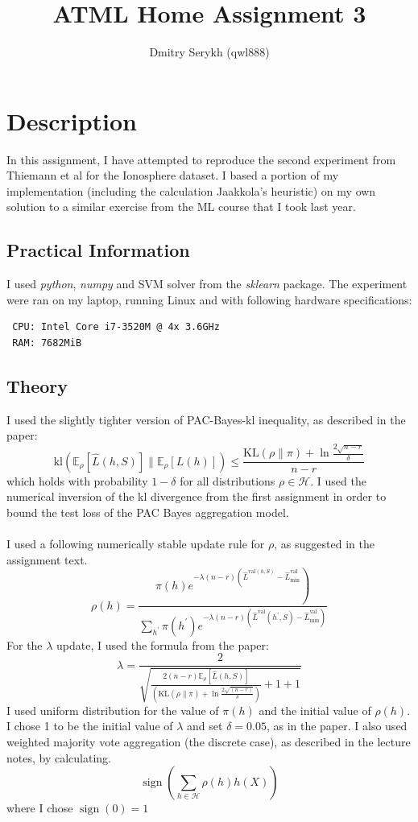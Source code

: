 \documentclass[a4paper]{article}
\title{\vspace{-5cm}ATML Home Assignment 3}
\author{Dmitry Serykh (qwl888)}
\begin{document}
\maketitle
\section{Description}
In this assignment, I have attempted to reproduce the second experiment from
Thiemann et al for the Ionosphere dataset. I based a portion of my implementation
(including the calculation Jaakkola's heuristic) on my own solution to a similar
exercise from the ML course that I took last year.

\subsection{Practical Information}
I used \emph{python}, \emph{numpy} and SVM solver
from the \emph{sklearn} package. The experiment were ran on my laptop, running
Linux and with following hardware specifications:
\begin{verbatim}
 CPU: Intel Core i7-3520M @ 4x 3.6GHz
 RAM: 7682MiB
\end{verbatim}

\subsection{Theory}
I used the slightly tighter version of PAC-Bayes-kl inequality, as described in
the paper:
\[
\mathrm{kl}\left(\mathbb{E}_{\rho}[\hat{L}(h, S)] \|
\mathbb{E}_{\rho}[L(h)]\right) \leq \frac{\mathrm{KL}(\rho \| \pi)+\ln \frac{2
    \sqrt{n-r}}{\delta}}{n-r}
\]
which holds with probability $1 - \delta$ for all distributions $\rho \in
\mathcal{H}$. I used the numerical inversion of the kl divergence from the first
assignment in order to bound the test loss of the PAC Bayes aggregation model.\\\\
I used a following numerically stable
update rule for $\rho$, as suggested in the assignment text.
\[
\rho(h) = 
\frac{\left.\pi(h) e^{-\lambda(n-r)\left(\hat{L}^{\mathrm{val}(h, S)}-\hat{L}_{\mathrm{min}}^{\mathrm{val}}\right.}\right)}{\sum_{h^{\prime}} \pi\left(h^{\prime}\right) e^{-\lambda(n-r)\left(\hat{L}^{\mathrm{val}}\left(h^{\prime}, S\right)-\hat{L}_{\mathrm{min}}^{\mathrm{val}}\right)}}
\]
For the $\lambda$ update, I used the formula from the paper:
\[
\lambda=\frac{2}{\sqrt{\frac{2(n-r) \mathbb{E}_{\rho}[\hat{L}(h, S)]}{\left(\mathrm{KL}(\rho \| \pi)+\ln \frac{2 \sqrt{(n-r)}}{\delta}\right)}+1+1}}
\]
I used uniform distribution for the value of $\pi(h)$ and the initial value of
$\rho(h)$. I chose 1 to be the initial value of $\lambda$ and set $\delta =
0.05$, as in the paper. I also used weighted majority vote aggregation (the
discrete case), as described in the lecture notes, by calculating.
\[
\operatorname{sign}\left(\sum_{h \in \mathcal{H}} \rho(h) h(X)\right)
\]
where I chose $\operatorname{sign}(0)=1$\\\\
\end{document}
